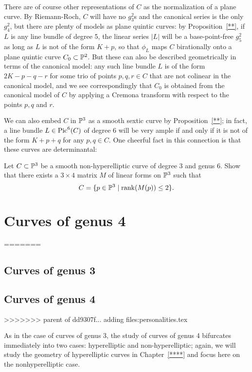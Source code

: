 There are of course other representations of $C$ as the normalization of a plane curve. By Riemann-Roch, $C$ will have no $g^2_3$s and the canonical series is the only $g^2_4$, but there are plenty of models as plane quintic curves: by Proposition~\ref{**}, if $L$ is any line bundle of degree 5, the linear series $|L|$ will be a base-point-free $g^2_5$ as long as $L$ is not of the form $K+p$, so that $\phi_L$ maps $C$ birationally onto a plane quintic curve $C_0 \subset \PP^2$. But these can also be described geometrically in terms of the canonical model: any such line bundle $L$ is of the form $2K-p-q-r$ for some trio of  points $p, q, r \in C$ that are not colinear in the canonical model, and we see correspondingly that $C_0$ is obtained from the canonical model of $C$ by applying a Cremona transform with respect to the points $p, q$ and $r$. 

We can also embed $C$ in $\PP^3$ as a smooth sextic curve by Proposition~\ref{**}; in fact, a line bundle $L \in \pic^6(C)$ of degree 6 will be very ample if and only if it is not of the form $K+p+q$ for any $p, q \in C$. One cheerful fact in this connection is that these curves are determinantal:

\begin{exercise}
Let $C \subset \PP^3$ be a smooth non-hyperelliptic curve of degree 3 and genus 6. Show that there exists a $3 \times 4$ matrix $M$ of linear forms on $\PP^3$ such that 
$$
C = \{ p \in \PP^3 \mid \rank(M(p)) \leq 2 \}.
$$
\end{exercise}

\section{Curves of genus 4}
=======
\subsection{Curves of genus 3}

\subsection{Curves of genus 4}
>>>>>>> parent of dd9307f... adding files:personalities.tex

As in the case of curves of genus 3, the study of curves of genus 4 bifurcates immediately into two cases: hyperelliptic and non-hyperelliptic; again, we will study the geometry of hyperelliptic curves in Chapter~\ref{****} and focus here on the nonhyperelliptic case.

